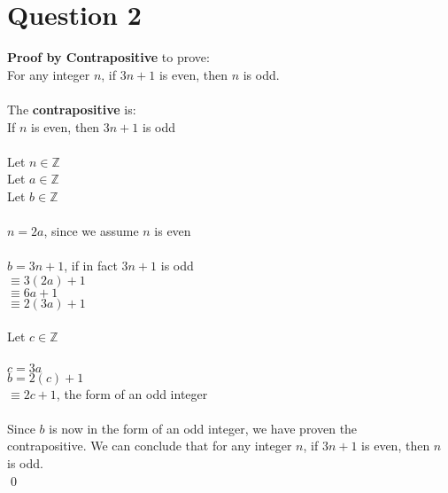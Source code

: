 \documentclass{article}
\begin{document}
    \section*{Question 2}
   \textbf{Proof by Contrapositive} to prove: \\
   \indent For any integer $n$, if $3n + 1$ is even, then $n$ is odd. \\ \\
   The \textbf{contrapositive} is: \\
   \indent If $n$ is even, then $3n + 1$ is odd \\ \\
   Let $n \in \mathbb{Z}$ \\
   Let $a \in \mathbb{Z}$ \\ 
   Let $b \in \mathbb{Z}$ \\ \\
   $n = 2a$, since we assume $n$ is even \\ \\
   $b = 3n + 1$, if in fact $3n + 1$ is odd \\
   $\equiv 3(2a) + 1$ \\
   $\equiv 6a + 1$ \\
   $\equiv 2(3a) + 1$ \\ \\
   Let $c \in \mathbb{Z}$ \\ \\
   $c = 3a$ \\
   $b = 2(c) + 1$ \\
   $\equiv 2c + 1$, the form of an odd integer \\ \\
   Since $b$ is now in the form of an odd integer, we have proven the \\ contrapositive. We can conclude that for any integer $n$, if $3n + 1$ is even, then $n$ is odd. \\ \qed
   
   
    \indent
    \newpage
\end{document}
